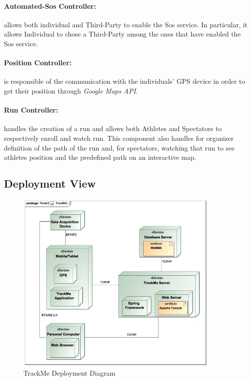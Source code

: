 \documentclass[a4paper]{article}
\begin{document}
    \paragraph{Automated-Sos Controller:}
    allows both individual and Third-Party to enable the Sos service. In particular, it allows Individual to chose a Third-Party among the ones that have enabled the Sos service.
    
    \paragraph{Position Controller:}
    is responsible of the communication with the individuals' GPS device in order to get their position through \textit{Google Maps API}.

    \paragraph{Run Controller:}
    handles the creation of a run and allows both Athletes and Spectators to respectively enroll and watch run. This component also handles for organizer definition of the path of the run and, for spectators, watching that run to see athletes position and the predefined path on an interactive map.

\newpage
\subsection{Deployment View}
\begin{figure}[!htpb]
    \centering
    \includegraphics[width=100mm,keepaspectratio]{images/UML/deployment_TrackMe.jpg}
    \caption{TrackMe Deployment Diagram}
    \label{fig:deployment_trackme}
\end{figure}
\end{document}
